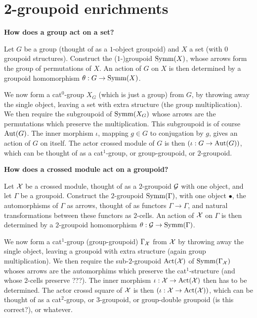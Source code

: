 

\section{2-groupoid enrichments}

\noindent
{\bf How does a group act on a set?}

Let $G$ be a group (thought of as a $1$-object groupoid) 
and $X$ a set (with $0$ groupoid structures). 
Construct the ($1$-)groupoid $\mathrm{Symm}(X)$, 
whose arrows form the group of permutations of $X$.
An action of $G$ on $X$ is then determined by a groupoid homomorphism 
$\theta : G \to \mathrm{Symm}(X)$.

We now form a cat$^0$-group $X_G$ (which is just a group) from $G$, 
by throwing away the single object, 
leaving a set with extra structure (the group multiplication). 
We then require the subgroupoid of $\mathrm{Symm}(X_G)$ whose arrows 
are the permutations which preserve the multiplication. 
This subgroupoid is of course $\mathrm{Aut}(G)$. 
The inner morphism $\iota$, mapping $g \in G$ to conjugation by $g$, 
gives an action of $G$ on itself. 
The actor crossed module of $G$ is then $(\iota : G \to \mathrm{Aut}(G))$, 
which can be thought of as a cat$^1$-group, 
or group-groupoid, or $2$-groupoid.

\bigskip\noindent
{\bf How does a crossed module act on a groupoid?} 

Let $\mathcal{X}$ be a crossed module, 
thought of as a $2$-groupoid $\mathcal{G}$ with one object, 
and let $\Gamma$ be a groupoid. 
Construct the $2$-groupoid $\mathrm{Symm}(\Gamma)$, with one object $\bullet$, 
the automorphisms of $\Gamma$ as arrows, 
thought of as functors $\Gamma \to \Gamma$, 
and natural transformations between these functors as $2$-cells. 
An action of $\mathcal{X}$ on $\Gamma$ is then determined by a 
$2$-groupoid homomorphism $\theta : \mathcal{G} \to \mathrm{Symm}(\Gamma)$.

We now form a cat$^1$-group (group-groupoid) $\Gamma_{\mathcal{X}}$ from $\mathcal{X}$ 
by throwing away the single object, 
leaving a groupoid with extra structure (again group multiplication).
We then require the sub-$2$-groupoid $\mathrm{Act}(\mathcal{X})$ 
of $\mathrm{Symm}(\Gamma_{\mathcal{X}})$ whoses arrows 
are the automorphims which preserve the cat$^1$-structure 
(and whose $2$-cells preserve ???). 
The inner morphism $\iota : \mathcal{X} \to \mathrm{Act}(\mathcal{X})$ then has to be determined.  
The actor crossd square of $\mathcal{X}$ is then 
$(\iota : \mathcal{X} \to \mathrm{Act}(\mathcal{X}))$, 
which can be thought of as a cat$^2$-group, 
or $3$-groupoid, or group-double groupoid (is this correct?), or whatever.

